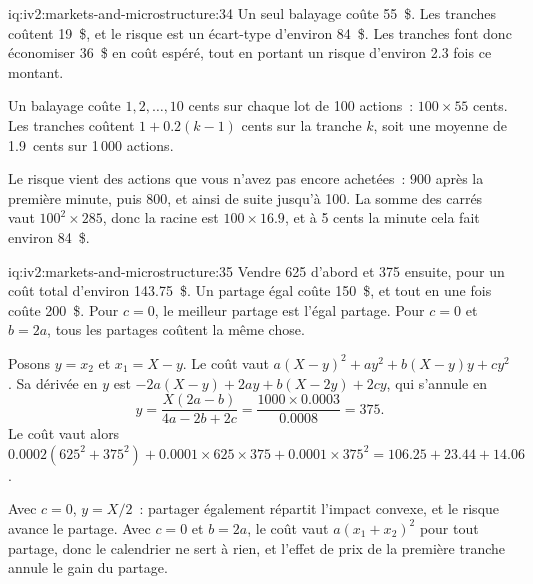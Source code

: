 \begin{solution}{iq:iv2:markets-and-microstructure:34}
Un seul balayage coûte 55~\$. Les tranches coûtent 19~\$, et le risque est un écart-type d'environ 84~\$. Les tranches font donc économiser 36~\$ en coût espéré, tout en portant un risque d'environ 2.3 fois ce montant.

Un balayage coûte $1, 2, \ldots, 10$ cents sur chaque lot de 100 actions~: $100 \times 55$ cents. Les tranches coûtent $1 + 0.2(k - 1)$ cents sur la tranche $k$, soit une moyenne de 1.9~cents sur 1\,000 actions.

Le risque vient des actions que vous n'avez pas encore achetées~: 900 après la première minute, puis 800, et ainsi de suite jusqu'à 100. La somme des carrés vaut $100^2 \times 285$, donc la racine est $100 \times 16.9$, et à 5 cents la minute cela fait environ 84~\$.

\end{solution}

\begin{solution}{iq:iv2:markets-and-microstructure:35}
Vendre 625 d'abord et 375 ensuite, pour un coût total d'environ 143.75~\$. Un partage égal coûte 150~\$, et tout en une fois coûte 200~\$. Pour $c = 0$, le meilleur partage est l'égal partage. Pour $c = 0$ et $b = 2a$, tous les partages coûtent la même chose.

Posons $y = x_2$ et $x_1 = X - y$. Le coût vaut $a(X - y)^2 + ay^2 + b(X - y)y + cy^2$. Sa dérivée en $y$ est $-2a(X - y) + 2ay + b(X - 2y) + 2cy$, qui s'annule en
\[
y = \frac{X(2a - b)}{4a - 2b + 2c} = \frac{1000 \times 0.0003}{0.0008} = 375.
\]
Le coût vaut alors $0.0002(625^2 + 375^2) + 0.0001 \times 625 \times 375 + 0.0001 \times 375^2 = 106.25 + 23.44 + 14.06$.

Avec $c = 0$, $y = X/2$~: partager également répartit l'impact convexe, et le risque avance le partage. Avec $c = 0$ et $b = 2a$, le coût vaut $a(x_1 + x_2)^2$ pour tout partage, donc le calendrier ne sert à rien, et l'effet de prix de la première tranche annule le gain du partage.

\end{solution}

